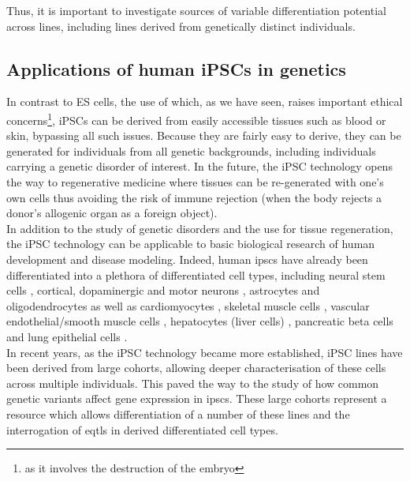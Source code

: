 Thus, it is important to investigate sources of variable differentiation potential across lines, including lines derived from genetically distinct individuals.

\subsection{Applications of human iPSCs in genetics}
\label{sec:ips_genetics}

In contrast to ES cells, the use of which, as we have seen, raises important ethical concerns\footnote{as it involves the destruction of the embryo}, iPSCs can be derived from easily accessible tissues such as blood or skin, bypassing all such issues.
Because they are fairly easy to derive, they can be generated for individuals from all genetic backgrounds, including individuals carrying a genetic disorder of interest.
In the future, the iPSC technology opens the way to regenerative medicine where tissues can be re-generated with one's own cells thus avoiding the risk of immune rejection (when the body rejects a donor's allogenic organ as a foreign object).\\

In addition to the study of genetic disorders and the use for tissue regeneration, the iPSC technology can be applicable to basic biological research of human development and disease modeling.
Indeed, human \glspl{ipsc} have already been differentiated into a plethora of differentiated cell types, including neural stem cells \cite{d2014large}, 
cortical, dopaminergic and motor neurons \cite{shi2012human, kriks2011dopamine, karumbayaram2009directed}, astrocytes \cite{shaltouki2013efficient} and oligodendrocytes \cite{douvaras2014efficient} as well as  cardiomyocytes \cite{burridge2014chemically}, skeletal muscle cells \cite{maffioletti2015efficient},  vascular endothelial/smooth muscle cells \cite{patsch2015generation}, hepatocytes (liver cells) \cite{si2010highly}, pancreatic beta cells \cite{zhang2009highly} and  lung epithelial cells \cite{huang2014efficient}.\\

In recent years, as the iPSC technology became more established, iPSC lines have been derived from large cohorts, allowing deeper characterisation of these cells across multiple individuals.
This paved the way to the study of how common genetic variants affect gene expression in \glspl{ipsc}.
These large cohorts represent a resource which allows differentiation of a number of these lines and the interrogation of \glspl{eqtl} in derived differentiated cell types.

